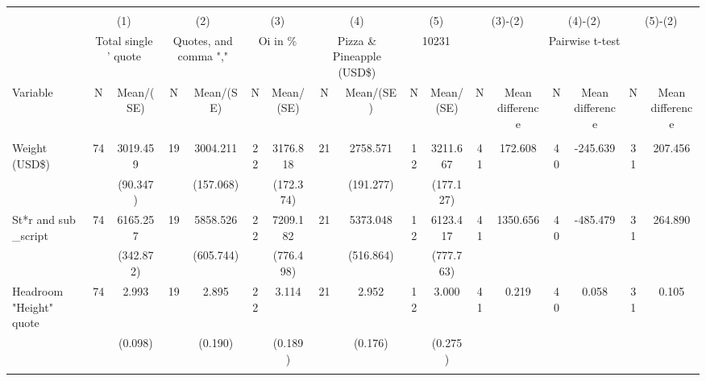 
\begin{tabular}{@{\extracolsep{5pt}}lcccccccccccccccc}
\\[-1.8ex]\hline \hline \\[-1.8ex]
 & \multicolumn{2}{c}{(1)}  & \multicolumn{2}{c}{(2)}  & \multicolumn{2}{c}{(3)}  & \multicolumn{2}{c}{(4)}  & \multicolumn{2}{c}{(5)}  & \multicolumn{2}{c}{(3)-(2)} & \multicolumn{2}{c}{(4)-(2)} & \multicolumn{2}{c}{(5)-(2)} \\
 & \multicolumn{2}{c}{Total single ' quote}  & \multicolumn{2}{c}{Quotes, and comma ","}  & \multicolumn{2}{c}{Oi in \%}  & \multicolumn{2}{c}{Pizza \& Pineapple (USD\$)}  & \multicolumn{2}{c}{10231}  & \multicolumn{6}{c}{Pairwise t-test}  \\
Variable & N & Mean/(SE) & N & Mean/(SE) & N & Mean/(SE) & N & Mean/(SE) & N & Mean/(SE) & N & Mean difference & N & Mean difference & N & Mean difference \\ \hline \\[-1.8ex] 
Weight (USD\$)   & 74    & 3019.459    & 19    & 3004.211    & 22    & 3176.818    & 21    & 2758.571    & 12    & 3211.667    & 41    & 172.608    & 40    & -245.639    & 31    & 207.456   \\
 &   & (90.347)  &   & (157.068)  &   & (172.374)  &   & (191.277)  &   & (177.127)  &   &  &   &  &   &   \\
St*r and sub \_script   & 74    & 6165.257    & 19    & 5858.526    & 22    & 7209.182    & 21    & 5373.048    & 12    & 6123.417    & 41    & 1350.656    & 40    & -485.479    & 31    & 264.890   \\
 &   & (342.872)  &   & (605.744)  &   & (776.498)  &   & (516.864)  &   & (777.763)  &   &  &   &  &   &   \\
Headroom "Height" quote   & 74    & 2.993    & 19    & 2.895    & 22    & 3.114    & 21    & 2.952    & 12    & 3.000    & 41    & 0.219    & 40    & 0.058    & 31    & 0.105   \\
 &   & (0.098)  &   & (0.190)  &   & (0.189)  &   & (0.176)  &   & (0.275)  &   &  &   &  &   &   \\
\hline \\[-1.8ex]

\end{tabular}
